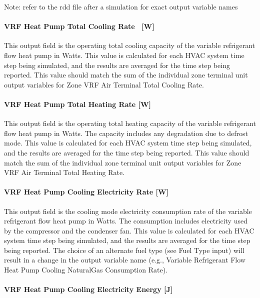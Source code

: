 Note: refer to the rdd file after a simulation for exact output variable names

\paragraph{VRF Heat Pump Total Cooling Rate ~{[}W{]}}\label{vrf-heat-pump-total-cooling-rate-w}

This output field is the operating total cooling capacity of the variable refrigerant flow heat pump in Watts. This value is calculated for each HVAC system time step being simulated, and the results are averaged for the time step being reported. This value should match the sum of the individual zone terminal unit output variables for Zone VRF Air Terminal Total Cooling Rate.

\paragraph{VRF Heat Pump Total Heating Rate {[}W{]}}\label{vrf-heat-pump-total-heating-rate-w}

This output field is the operating total heating capacity of the variable refrigerant flow heat pump in Watts. The capacity includes any degradation due to defrost mode. This value is calculated for each HVAC system time step being simulated, and the results are averaged for the time step being reported. This value should match the sum of the individual zone terminal unit output variables for Zone VRF Air Terminal Total Heating Rate.

\paragraph{VRF Heat Pump Cooling Electricity Rate {[}W{]}}\label{vrf-heat-pump-cooling-electric-power-w}

This output field is the cooling mode electricity consumption rate of the variable refrigerant flow heat pump in Watts. The consumption includes electricity used by the compressor and the condenser fan. This value is calculated for each HVAC system time step being simulated, and the results are averaged for the time step being reported. The choice of an alternate fuel type (see Fuel Type input) will result in a change in the output variable name (e.g., Variable Refrigerant Flow Heat Pump Cooling NaturalGas Consumption Rate).

\paragraph{VRF Heat Pump Cooling Electricity Energy {[}J{]}}\label{vrf-heat-pump-cooling-electric-energy-j}

